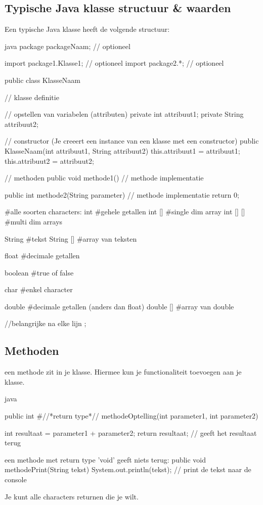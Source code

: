 \documentclass[a4paper,11pt]{article}
\begin{document}
\subsection{Typische Java klasse structuur \& waarden}
Een typische Java klasse heeft de volgende structuur:
\begin{codeblock}{java}
    package packageNaam; // optioneel

    import package1.Klasse1; // optioneel
    import package2.*; // optioneel

    public class KlasseNaam { // klasse definitie

        // opstellen van variabelen (attributen)
        private int attribuut1;
        private String attribuut2;

        // constructor (Je creeert een instance van een klasse met een constructor)
        public KlasseNaam(int attribuut1, String attribuut2) {
            this.attribuut1 = attribuut1;
            this.attribuut2 = attribuut2;
        }

        // methoden
        public void methode1() {
            // methode implementatie
        }

        public int methode2(String parameter) {
            // methode implementatie
            return 0;
        }

        #alle soorten characters:
        int #gehele getallen
        int [] #single dim array
        int [] [] #multi dim arrays

        String #tekst
        String [] #array van teksten

        float #decimale getallen

        boolean #true of false

        char #enkel character

        double #decimale getallen (anders dan float)
        double [] #array van double

        //belangrijke na elke lijn ;

    }
\end{codeblock}

\subsection{Methoden}

een methode zit in je klasse. Hiermee
kun je functionaliteit toevoegen aan je klasse.

\begin{codeblock}{java}

    public int #//*return type*// methodeOptelling(int parameter1, int parameter2) 
    {  
        int resultaat = parameter1 + parameter2;
        return resultaat; // geeft het resultaat terug

    }

    een methode met return type 'void' geeft niets terug:
    public void methodePrint(String tekst) 
    {  
        System.out.println(tekst); // print de tekst naar de console
    }

    Je kunt alle characters returnen die je wilt.
\end{codeblock}
\end{document}

